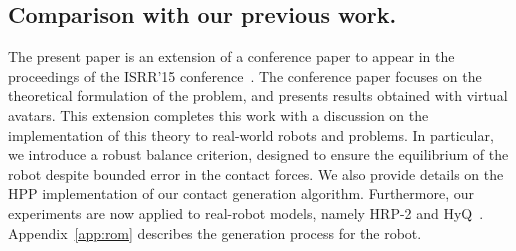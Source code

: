 \subsection*{Comparison with our previous work.}
The present paper is an extension of a conference paper to appear in the proceedings of the ISRR'15 conference~\citep{tonneauisrr15}.
The conference paper focuses on the theoretical formulation of the problem, and presents results obtained with virtual avatars.
This extension completes this work with a discussion on the implementation of this theory to real-world robots and problems.
In particular, we introduce a robust balance criterion, designed to ensure the equilibrium of the robot despite bounded error in the contact forces. We also provide details on the HPP implementation
of our contact generation algorithm. Furthermore, our experiments are now applied to real-robot models, namely HRP-2 and HyQ~\citep{semini11hyqdesignjsce}. Appendix~\ref{app:rom} describes the generation process
for the robot.
